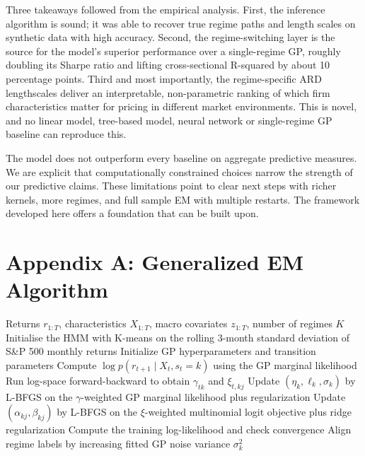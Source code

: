 \documentclass[11pt]{article}
\begin{document}
Three takeaways followed from the empirical analysis. First, the inference algorithm is sound; it was able to recover true regime paths and length scales on synthetic data with high accuracy. Second, the regime-switching layer is the source for the model's superior performance over a single-regime GP, roughly doubling its Sharpe ratio and lifting cross-sectional R-squared by about 10 percentage points. Third and most importantly, the regime-specific ARD lengthscales deliver an interpretable, non-parametric ranking of which firm characteristics matter for pricing in different market environments. This is novel, and no linear model, tree-based model, neural network or single-regime GP baseline can reproduce this. 

The model does not outperform every baseline on aggregate predictive measures. We are explicit that computationally constrained choices narrow the strength of our predictive claims. These limitations point to clear next steps with richer kernels, more regimes, and full sample EM with multiple restarts. The framework developed here offers a foundation that can be built upon. 



\pagebreak

\section*{Appendix A: Generalized EM Algorithm}
\begin{algorithm}[H]
\caption{Generalized EM for Regime-Switching GP Asset Pricing}
\begin{algorithmic}[1]
\Require Returns \(r_{1:T}\), characteristics \(X_{1:T}\), macro covariates \(z_{1:T}\), number of regimes \(K\)
\State Initialise the HMM with K-means on the rolling 3-month standard deviation of S\&P 500 monthly returns
\State Initialize GP hyperparameters and transition parameters
\Repeat
        \State Compute \(\log p(r_{t+1}\mid X_t,s_t=k)\) using the GP marginal likelihood
    \EndFor
    \State Run log-space forward-backward to obtain \(\gamma_{tk}\) and \(\xi_{t,kj}\)
        \State Update \((\eta_k,\ell_k,\sigma_k)\) by L-BFGS on the \(\gamma\)-weighted GP marginal likelihood plus regularization
    \EndFor
    \State Update \((\alpha_{kj},\beta_{kj})\) by L-BFGS on the \(\xi\)-weighted multinomial logit objective plus ridge regularization
    \State Compute the training log-likelihood and check convergence
\State Align regime labels by increasing fitted GP noise variance \(\sigma_k^2\)
\end{algorithmic}
\end{algorithm}
\pagebreak
\end{document}
